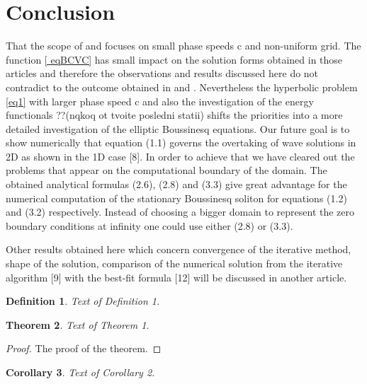 \documentclass[12pt]{article}
\theoremstyle{theorem}
\newtheorem{theorem}{Theorem}
\newtheorem{corollary}[theorem]{Corollary}
\theoremstyle{defi}
\newtheorem{definition}[theorem]{Definition}
\begin{document}
\section{Conclusion}
	That the scope of \cite{ref6} and \cite{ref10} focuses on small phase speeds c and non-uniform grid. The function \ref{ eqBCVC} has small impact on the solution forms obtained in those articles and therefore the observations and results discussed here do not contradict to the outcome obtained in \cite{ref6} and \cite{ref10}. Nevertheless the hyperbolic problem \ref{eq1} with larger phase speed c and also the investigation of the energy functionals ??(nqkoq ot tvoite posledni statii) shifts the priorities into a more detailed investigation of the elliptic Boussinesq equations. Our future goal is to show numerically that equation (1.1) governs the overtaking of wave solutions in 2D as shown in the 1D case [8]. In order to achieve that we have cleared out the problems that appear on the computational boundary of the domain.  The obtained analytical formulas (2.6), (2.8) and (3.3) give great advantage for the numerical computation of the stationary Boussinesq soliton for equations (1.2) and  (3.2) respectively. Instead of choosing a bigger domain to represent the zero boundary conditions at infinity one could use either (2.8) or (3.3).

Other results obtained here which concern convergence of the iterative method, shape of the solution, comparison of the numerical solution from the iterative algorithm [9] with the best-fit formula [12] will be discussed in another article.









\begin{definition}
Text of Definition 1.
\end{definition}

\begin{theorem}
Text of Theorem 1.
\end{theorem}

\begin{proof}
The proof of the theorem.
\end{proof}

\begin{corollary}
Text of Corollary 2.
\end{corollary}

\end{document}
